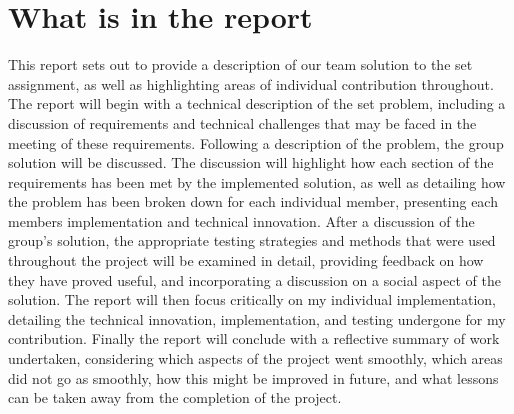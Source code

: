 \section{What is in the report}

This report sets out to provide a description of our team solution to the set 
assignment, as well as highlighting areas of individual contribution throughout.
The report will begin with a technical description of the set problem, 
including a discussion of requirements and technical challenges that may be 
faced in the meeting of these requirements. 
Following a description of the problem, the group solution will be discussed. 
The discussion will highlight how each section of the requirements has been met 
by the implemented solution, as well as detailing how the problem has been broken 
down for each individual member, presenting each members implementation and 
technical innovation. 
After a discussion of the group's solution, the appropriate testing strategies 
and methods that were used throughout the project will be examined in detail, 
providing feedback on how they have proved useful, and incorporating a 
discussion on a social aspect of the solution.
The report will then focus critically on my individual implementation, 
detailing the technical innovation, implementation, and testing undergone for my 
contribution. 
Finally the report will conclude with a reflective summary of work 
undertaken, considering which aspects of the project went smoothly, which areas
did not go as smoothly, how this might be improved in future, and what lessons 
can be taken away from the completion of the project. 
